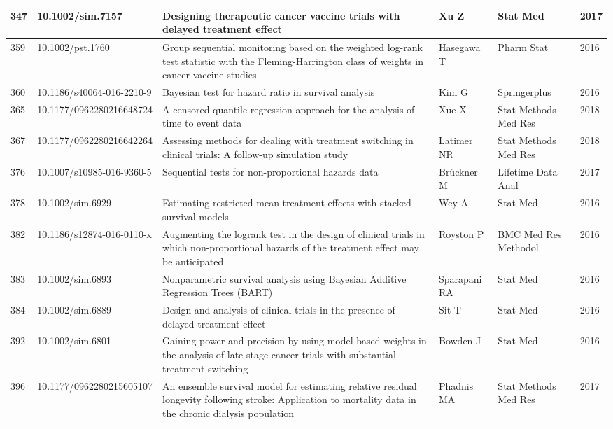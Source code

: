 \begin{landscape}
\begin{longtable}{|p{0.3in}|p{1.8in}|p{2.4in}|p{0.68in}|p{0.89in}|p{0.3in}|}
347 & 10.1002/sim.7157    & Designing therapeutic cancer vaccine trials with delayed treatment effect & Xu Z & Stat Med & 2017 \\ \hline 
359 & 10.1002/pst.1760   & Group sequential monitoring based on the weighted log-rank test statistic with the Fleming-Harrington class of weights in cancer vaccine studies & Hasegawa T & Pharm Stat & 2016 \\ \hline 
360 & 10.1186/s40064-016-2210-9      & Bayesian test for hazard ratio in survival analysis & Kim G & Springerplus & 2016 \\ \hline 
365 & 10.1177/0962280216648724      & A censored quantile regression approach for the analysis of time to event data & Xue X & Stat Methods Med Res & 2018 \\ \hline 
367 & 10.1177/0962280216642264      & Assessing methods for dealing with treatment switching in clinical trials: A follow-up simulation study & Latimer NR & Stat Methods Med Res & 2018 \\ \hline 
376 & 10.1007/s10985-016-9360-5       & Sequential tests for non-proportional hazards data & Br\"{u}ckner M & Lifetime Data Anal & 2017 \\ \hline 
378 & 10.1002/sim.6929       & Estimating restricted mean treatment effects with stacked survival models & Wey A & Stat Med & 2016 \\ \hline 
382 & 10.1186/s12874-016-0110-x       & Augmenting the logrank test in the design of clinical trials in which non-proportional hazards of the treatment effect may be anticipated & Royston P & BMC Med Res Methodol & 2016 \\ \hline 
383 & 10.1002/sim.6893       & Nonparametric survival analysis using Bayesian Additive Regression Trees (BART) & Sparapani RA & Stat Med & 2016 \\ \hline 
384 & 10.1002/sim.6889       & Design and analysis of clinical trials in the presence of delayed treatment effect & Sit T & Stat Med & 2016 \\ \hline 
392 & 10.1002/sim.6801        & Gaining power and precision by using model-based weights in the analysis of late stage cancer trials with substantial treatment switching & Bowden J & Stat Med & 2016 \\ \hline 
396 & 10.1177/0962280215605107 & An ensemble survival model for estimating relative residual longevity following stroke: Application to mortality data in the chronic dialysis population & Phadnis MA & Stat Methods Med Res & 2017 \\ \hline 

\end{longtable}
\end{landscape}
